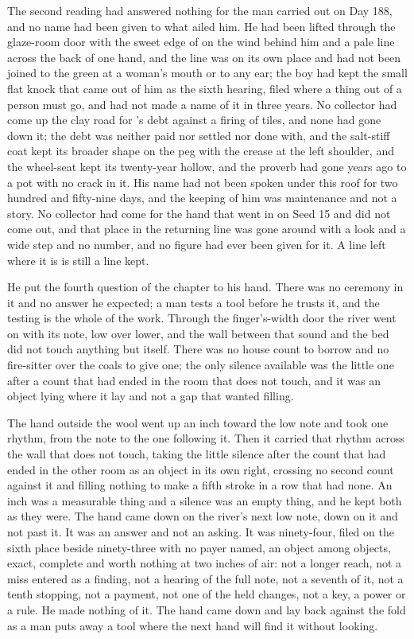 \scenebreak

The second reading had answered nothing for the man carried out on Day 188, and no name had been given to what ailed him. He had been lifted through the glaze-room door with the sweet edge of  on the wind behind him and a pale line across the back of one hand, and the line was on its own place and had not been joined to the green at a woman's mouth or to any ear; the boy had kept the small flat knock that came out of him as the sixth hearing, filed where a thing out of a person must go, and had not made a name of it in three years. No collector had come up the clay road for 's debt against a firing of tiles, and none had gone down it; the debt was neither paid nor settled nor done with, and the salt-stiff coat kept its broader shape on the peg with the crease at the left shoulder, and the wheel-seat kept its twenty-year hollow, and the proverb had gone years ago to a pot with no crack in it. His name had not been spoken under this roof for two hundred and fifty-nine days, and the keeping of him was maintenance and not a story. No collector had come for the hand that went in on Seed 15 and did not come out, and that place in the returning line was gone around with a look and a wide step and no number, and no figure had ever been given for it. A line left where it is is still a line kept.

He put the fourth question of the chapter to his hand. There was no ceremony in it and no answer he expected; a man tests a tool before he trusts it, and the testing is the whole of the work. Through the finger's-width door the river went on with its note, low over lower, and the wall between that sound and the bed did not touch anything but itself. There was no house count to borrow and no fire-sitter over the coals to give one; the only silence available was the little one after a count that had ended in the room that does not touch, and it was an object lying where it lay and not a gap that wanted filling.

The hand outside the wool went up an inch toward the low note and took one rhythm, from the note to the one following it. Then it carried that rhythm across the wall that does not touch, taking the little silence after the count that had ended in the other room as an object in its own right, crossing no second count against it and filling nothing to make a fifth stroke in a row that had none. An inch was a measurable thing and a silence was an empty thing, and he kept both as they were. The hand came down on the river's next low note, down on it and not past it. It was an answer and not an asking. It was ninety-four, filed on the sixth place beside ninety-three with no payer named, an object among objects, exact, complete and worth nothing at two inches of air: not a longer reach, not a miss entered as a finding, not a hearing of the full note, not a seventh of it, not a tenth stopping, not a payment, not one of the held changes, not a key, a power or a rule. He made nothing of it. The hand came down and lay back against the fold as a man puts away a tool where the next hand will find it without looking.

